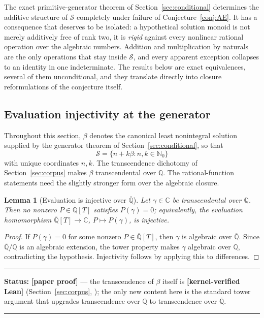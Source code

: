 \documentclass[11pt,oneside]{article}
\newtheorem{lemma}[theorem]{Lemma}
\theoremstyle{definition}
\theoremstyle{remark}
\newcommand{\Nzero}{\mathbb N_0}
\newcommand{\Q}{\mathbb Q}
\newcommand{\C}{\mathbb C}
\newcommand{\Abar}{\overline{\mathbb Q}}
\newcommand{\Sol}{\mathcal S}
\newcommand{\lean}[1]{\texttt{\detokenize{#1}}}
\newcommand{\statuslean}{\textcolor{leanblue}{\textbf{[kernel-verified Lean]}}}
\newcommand{\statusnew}{\textcolor{newgreen}{\textbf{[paper proof]}}}
\newenvironment{statusbox}[1]
{\begin{center}\begin{minipage}{0.94\textwidth}\raggedright\hbadness=10000\hrule
\vspace{0.45em}\textbf{Status:} #1\par\vspace{0.35em}}
{\vspace{0.35em}\hrule\end{minipage}\end{center}}
\begin{document}
The exact primitive-generator theorem of Section~\ref{sec:conditional} determines the
additive structure of $\Sol$ completely under failure of Conjecture~\ref{conj:AE}.  It has a
consequence that deserves to be isolated: a hypothetical solution monoid is not merely
additively free of rank two, it is \emph{rigid} against every nonlinear rational operation
over the algebraic numbers.  Addition and multiplication by naturals are the only operations
that stay inside $\Sol$, and every apparent exception collapses to an identity in one
indeterminate.  The results below are exact equivalences, several of them unconditional, and
they translate directly into closure reformulations of the conjecture itself.

\subsection{Evaluation injectivity at the generator}

Throughout this section, $\beta$ denotes the canonical least nonintegral solution supplied by
the generator theorem of Section~\ref{sec:conditional}, so that
\[
 \Sol=\{n+k\beta:n,k\in\Nzero\}
\]
with unique coordinates $n,k$.  The transcendence dichotomy of Section~\ref{sec:corpus} makes
$\beta$ transcendental over $\Q$.  The rational-function statements need the slightly stronger
form over the algebraic closure.

\begin{lemma}[Evaluation is injective over $\Abar$]
\label{rr:lem-eval-inj}
Let $\gamma\in\C$ be transcendental over $\Q$.  Then no nonzero $P\in\Abar[T]$ satisfies
$P(\gamma)=0$; equivalently, the evaluation homomorphism
$\Abar[T]\to\C$, $P\mapsto P(\gamma)$, is injective.
\end{lemma}

\begin{proof}
If $P(\gamma)=0$ for some nonzero $P\in\Abar[T]$, then $\gamma$ is algebraic over $\Abar$.
Since $\Abar/\Q$ is an algebraic extension, the tower property makes $\gamma$ algebraic over
$\Q$, contradicting the hypothesis.  Injectivity follows by applying this to differences.
\end{proof}

\begin{statusbox}{\statusnew{} --- the transcendence of $\beta$ itself is \statuslean{}
(Section~\ref{sec:corpus}, \lean{Transcendence}); the only new content here is the standard
tower argument that upgrades transcendence over $\Q$ to transcendence over $\Abar$.}
\end{statusbox}
\end{document}
